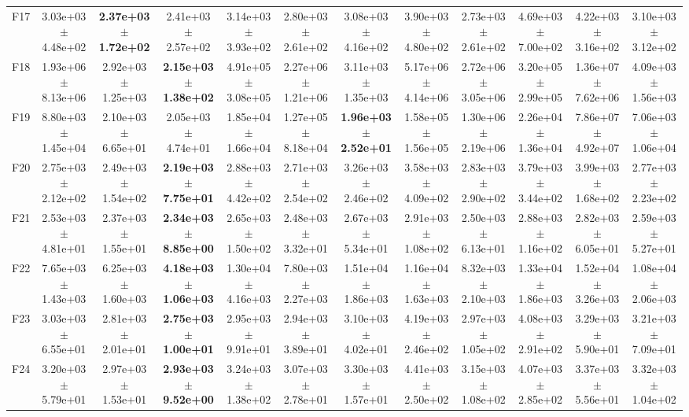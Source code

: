\begin{table}
{\begin{tabular}{lccccccccccc}
F17 & 3.03e+03 $\pm$ 4.48e+02 & \textbf{2.37e+03 $\pm$ 1.72e+02} & 2.41e+03 $\pm$ 2.57e+02 & 3.14e+03 $\pm$ 3.93e+02 & 2.80e+03 $\pm$ 2.61e+02 & 3.08e+03 $\pm$ 4.16e+02 & 3.90e+03 $\pm$ 4.80e+02 & 2.73e+03 $\pm$ 2.61e+02 & 4.69e+03 $\pm$ 7.00e+02 & 4.22e+03 $\pm$ 3.16e+02 & 3.10e+03 $\pm$ 3.12e+02 \\
F18 & 1.93e+06 $\pm$ 8.13e+06 & 2.92e+03 $\pm$ 1.25e+03 & \textbf{2.15e+03 $\pm$ 1.38e+02} & 4.91e+05 $\pm$ 3.08e+05 & 2.27e+06 $\pm$ 1.21e+06 & 3.11e+03 $\pm$ 1.35e+03 & 5.17e+06 $\pm$ 4.14e+06 & 2.72e+06 $\pm$ 3.05e+06 & 3.20e+05 $\pm$ 2.99e+05 & 1.36e+07 $\pm$ 7.62e+06 & 4.09e+03 $\pm$ 1.56e+03 \\
F19 & 8.80e+03 $\pm$ 1.45e+04 & 2.10e+03 $\pm$ 6.65e+01 & 2.05e+03 $\pm$ 4.74e+01 & 1.85e+04 $\pm$ 1.66e+04 & 1.27e+05 $\pm$ 8.18e+04 & \textbf{1.96e+03 $\pm$ 2.52e+01} & 1.58e+05 $\pm$ 1.56e+05 & 1.30e+06 $\pm$ 2.19e+06 & 2.26e+04 $\pm$ 1.36e+04 & 7.86e+07 $\pm$ 4.92e+07 & 7.06e+03 $\pm$ 1.06e+04 \\
F20 & 2.75e+03 $\pm$ 2.12e+02 & 2.49e+03 $\pm$ 1.54e+02 & \textbf{2.19e+03 $\pm$ 7.75e+01} & 2.88e+03 $\pm$ 4.42e+02 & 2.71e+03 $\pm$ 2.54e+02 & 3.26e+03 $\pm$ 2.46e+02 & 3.58e+03 $\pm$ 4.09e+02 & 2.83e+03 $\pm$ 2.90e+02 & 3.79e+03 $\pm$ 3.44e+02 & 3.99e+03 $\pm$ 1.68e+02 & 2.77e+03 $\pm$ 2.23e+02 \\
F21 & 2.53e+03 $\pm$ 4.81e+01 & 2.37e+03 $\pm$ 1.55e+01 & \textbf{2.34e+03 $\pm$ 8.85e+00} & 2.65e+03 $\pm$ 1.50e+02 & 2.48e+03 $\pm$ 3.32e+01 & 2.67e+03 $\pm$ 5.34e+01 & 2.91e+03 $\pm$ 1.08e+02 & 2.50e+03 $\pm$ 6.13e+01 & 2.88e+03 $\pm$ 1.16e+02 & 2.82e+03 $\pm$ 6.05e+01 & 2.59e+03 $\pm$ 5.27e+01 \\
F22 & 7.65e+03 $\pm$ 1.43e+03 & 6.25e+03 $\pm$ 1.60e+03 & \textbf{4.18e+03 $\pm$ 1.06e+03} & 1.30e+04 $\pm$ 4.16e+03 & 7.80e+03 $\pm$ 2.27e+03 & 1.51e+04 $\pm$ 1.86e+03 & 1.16e+04 $\pm$ 1.63e+03 & 8.32e+03 $\pm$ 2.10e+03 & 1.33e+04 $\pm$ 1.86e+03 & 1.52e+04 $\pm$ 3.26e+03 & 1.08e+04 $\pm$ 2.06e+03 \\
F23 & 3.03e+03 $\pm$ 6.55e+01 & 2.81e+03 $\pm$ 2.01e+01 & \textbf{2.75e+03 $\pm$ 1.00e+01} & 2.95e+03 $\pm$ 9.91e+01 & 2.94e+03 $\pm$ 3.89e+01 & 3.10e+03 $\pm$ 4.02e+01 & 4.19e+03 $\pm$ 2.46e+02 & 2.97e+03 $\pm$ 1.05e+02 & 4.08e+03 $\pm$ 2.91e+02 & 3.29e+03 $\pm$ 5.90e+01 & 3.21e+03 $\pm$ 7.09e+01 \\
F24 & 3.20e+03 $\pm$ 5.79e+01 & 2.97e+03 $\pm$ 1.53e+01 & \textbf{2.93e+03 $\pm$ 9.52e+00} & 3.24e+03 $\pm$ 1.38e+02 & 3.07e+03 $\pm$ 2.78e+01 & 3.30e+03 $\pm$ 1.57e+01 & 4.41e+03 $\pm$ 2.50e+02 & 3.15e+03 $\pm$ 1.08e+02 & 4.07e+03 $\pm$ 2.85e+02 & 3.37e+03 $\pm$ 5.56e+01 & 3.32e+03 $\pm$ 1.04e+02 \\

\end{tabular}}
\end{table}

